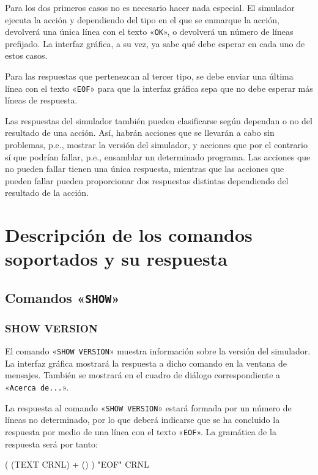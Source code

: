 \documentclass[notitlepage,11pt,a4paper,final,twoside]{article}
\begin{document}
Para los dos primeros casos no es necesario hacer nada especial. El
simulador ejecuta la acción y dependiendo del tipo en el que se
enmarque la acción, devolverá una única línea con el texto
«\texttt{OK}», o devolverá un número de líneas prefijado. La interfaz
gráfica, a su vez, ya sabe qué debe esperar en cada uno de estos
casos.

Para las respuestas que pertenezcan al tercer tipo, se debe enviar una
última línea con el texto «\verb+EOF+» para que la interfaz gráfica
sepa que no debe esperar más líneas de respuesta.

Las respuestas del simulador también pueden clasificarse según
dependan o no del resultado de una acción. Así, habrán acciones que se
llevarán a cabo sin problemas, p.e., mostrar la versión del simulador,
y acciones que por el contrario sí que podrían fallar, p.e., ensamblar
un determinado programa. Las acciones que no pueden fallar tienen una
única respuesta, mientras que las acciones que pueden fallar pueden
proporcionar dos respuestas distintas dependiendo del resultado de la
acción.

\section{Descripción de los comandos soportados y su respuesta}

\subsection{Comandos «\texttt{SHOW}»}

\subsubsection{SHOW VERSION}

El comando «\texttt{SHOW VERSION}» muestra información sobre la
versión del simulador. La interfaz gráfica mostrará la respuesta a
dicho comando en la ventana de mensajes. También se mostrará en el
cuadro de diálogo correspondiente a «\verb|Acerca de...|».


La respuesta al comando «\texttt{SHOW VERSION}» estará formada por un
número de líneas no determinado, por lo que deberá indicarse que se ha
concluido la respuesta por medio de una línea con el texto
«\texttt{EOF}». La gramática de la respuesta será por tanto:

\begin{rail}
 ( (TEXT CRNL) + () ) "EOF" CRNL
\end{rail}
\end{document}
